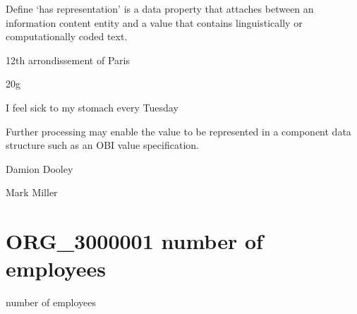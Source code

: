 \documentclass[letterpaper,10pt,english]{sphinxmanual}
\begin{document}
\begin{sphinxShadowBox}

\sphinxAtStartPar
Define ‘has representation’ is a data property that attaches between an information content entity and a value that contains linguistically or computationally coded text.
\end{sphinxShadowBox}

\begin{sphinxShadowBox}

\sphinxAtStartPar
12th arrondissement of Paris

\sphinxAtStartPar
20g

\sphinxAtStartPar
I feel sick to my stomach every Tuesday
\end{sphinxShadowBox}

\begin{sphinxShadowBox}

\sphinxAtStartPar
Further processing may enable the value to be represented in a component data structure such as an OBI value specification.
\end{sphinxShadowBox}

\begin{sphinxShadowBox}

\sphinxAtStartPar
{}
\end{sphinxShadowBox}

\begin{sphinxShadowBox}

\sphinxAtStartPar
Damion Dooley

\sphinxAtStartPar
Mark Miller
\end{sphinxShadowBox}
\begin{quote}

\ignorespaces \end{quote}


\section{ORG\_3000001 \sphinxhyphen{} number of employees}
\label{\detokenize{doc-ORG_3000001:org-3000001-number-of-employees}}\label{\detokenize{doc-ORG_3000001:index-0}}\label{\detokenize{doc-ORG_3000001::doc}}
\begin{sphinxShadowBox}

\sphinxAtStartPar
number of employees
\end{sphinxShadowBox}
\end{document}
